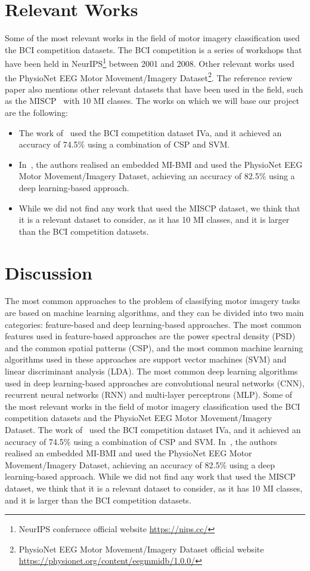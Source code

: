 \section{Relevant Works}
Some of the most relevant works in the field of motor imagery classification used the BCI competition datasets.
The BCI competition is a series of workshops that have been held in NeurIPS\footnote{NeurIPS confernece official website \url{https://nips.cc/}} between 2001 and 2008.
Other relevant works used the PhysioNet EEG Motor Movement/Imagery Dataset\footnote{PhysioNet EEG Motor Movement/Imagery Dataset official website \url{https://physionet.org/content/eegmmidb/1.0.0/}}.
The reference review paper also mentions other relevant datasets that have been used in the field, such as the MISCP~\cite{kaya2018large} with 10 MI classes.
The works on which we will base our project are the following:
\begin{itemize}
    \item The work of~\cite{amin2019multilevel} used the BCI competition dataset IVa, and it achieved an accuracy of 74.5\% using a combination of CSP and SVM.
    \item In~\cite{10409134}, the authors realised an embedded MI-BMI and used the PhysioNet EEG Motor Movement/Imagery Dataset, achieving an accuracy of 82.5\% using a deep learning-based approach.
    \item While we did not find any work that used the MISCP dataset, we think that it is a relevant dataset to consider, as it has 10 MI classes, and it is larger than the BCI competition datasets.
\end{itemize}

\section{Discussion}
The most common approaches to the problem of classifying motor imagery tasks are based on machine learning algorithms, and they can be divided into two main categories: feature-based and deep learning-based approaches.
The most common features used in feature-based approaches are the power spectral density (PSD) and the common spatial patterns (CSP), and the most common machine learning algorithms used in these approaches are support vector machines (SVM) and linear discriminant analysis (LDA).
The most common deep learning algorithms used in deep learning-based approaches are convolutional neural networks (CNN), recurrent neural networks (RNN) and multi-layer perceptrons (MLP).
Some of the most relevant works in the field of motor imagery classification used the BCI competition datasets and the PhysioNet EEG Motor Movement/Imagery Dataset.
The work of~\cite{amin2019multilevel} used the BCI competition dataset IVa, and it achieved an accuracy of 74.5\% using a combination of CSP and SVM.
In~\cite{10409134}, the authors realised an embedded MI-BMI and used the PhysioNet EEG Motor Movement/Imagery Dataset, achieving an accuracy of 82.5\% using a deep learning-based approach.
While we did not find any work that used the MISCP dataset, we think that it is a relevant dataset to consider, as it has 10 MI classes, and it is larger than the BCI competition datasets.
